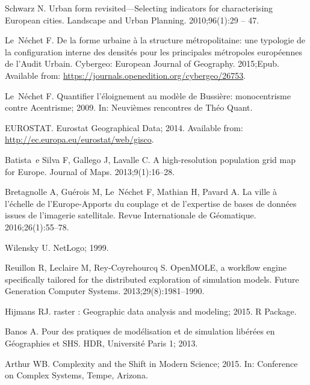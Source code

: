 \documentclass[10pt,letterpaper]{article}
\begin{document}
\begin{thebibliography}{10}
Schwarz N.
\newblock Urban form revisited---Selecting indicators for characterising
  European cities.
\newblock Landscape and Urban Planning. 2010;96(1):29 -- 47.

Le~N{\'e}chet F.
\newblock De la forme urbaine {\`a} la structure m{\'e}tropolitaine: une
  typologie de la configuration interne des densit{\'e}s pour les principales
  m{\'e}tropoles europ{\'e}ennes de l'Audit Urbain.
\newblock Cybergeo: European Journal of Geography. 2015;Epub.
\newblock Available from:
  \url{https://journals.openedition.org/cybergeo/26753}.

Le~N{\'e}chet F. Quantifier l'{\'e}loignement au mod{\`e}le de Bussi{\`e}re:
  monocentrisme contre Acentrisme; 2009.
\newblock In: Neuvi{\`e}mes rencontres de Th{\'e}o Quant.

EUROSTAT. Eurostat Geographical Data; 2014.
\newblock Available from: \url{http://ec.europa.eu/eurostat/web/gisco}.

Batista~e Silva F, Gallego J, Lavalle C.
\newblock A high-resolution population grid map for Europe.
\newblock Journal of Maps. 2013;9(1):16--28.

Bretagnolle A, Gu{\'e}rois M, Le~N{\'e}chet F, Mathian H, Pavard A.
\newblock La ville {\`a} l'{\'e}chelle de l'Europe-Apports du couplage et de
  l'expertise de bases de donn{\'e}es issues de l'imagerie satellitale.
\newblock Revue Internationale de G{\'e}omatique. 2016;26(1):55--78.

Wilensky U. NetLogo; 1999.

Reuillon R, Leclaire M, Rey-Coyrehourcq S.
\newblock OpenMOLE, a workflow engine specifically tailored for the distributed
  exploration of simulation models.
\newblock Future Generation Computer Systems. 2013;29(8):1981--1990.

Hijmans RJ. raster : Geographic data analysis and modeling; 2015.
\newblock R Package.

Banos A.
\newblock Pour des pratiques de mod{\'e}lisation et de simulation
  lib{\'e}r{\'e}es en G{\'e}ographies et SHS.
\newblock HDR, Universit{\'e} Paris 1; 2013.

Arthur WB. Complexity and the Shift in Modern Science; 2015.
\newblock In: Conference on Complex Systems, Tempe, Arizona.


\end{thebibliography}
\end{document}
